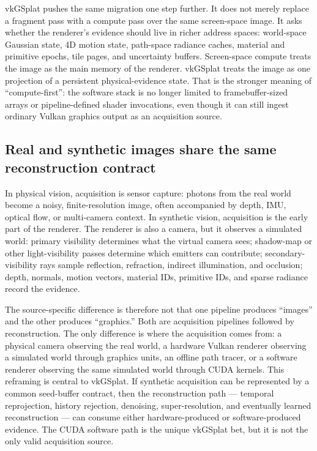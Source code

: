 \documentclass[10pt,journal,onecolumn]{IEEEtran}
\begin{document}
vkGSplat pushes the same migration one step further. It does not merely replace
a fragment pass with a compute pass over the same screen-space image. It asks
whether the renderer's evidence should live in richer address spaces:
world-space Gaussian state, 4D motion state, path-space radiance caches,
material and primitive epochs, tile pages, and uncertainty buffers. Screen-space
compute treats the image as the main memory of the renderer. vkGSplat treats the
image as one projection of a persistent physical-evidence state. That is the
stronger meaning of ``compute-first'': the software stack is no longer limited
to framebuffer-sized arrays or pipeline-defined shader invocations, even though
it can still ingest ordinary Vulkan graphics output as an acquisition source.

\subsection{Real and synthetic images share the same reconstruction
contract}

In physical vision, acquisition is sensor capture: photons from the
real world become a noisy, finite-resolution image, often accompanied
by depth, IMU, optical flow, or multi-camera context. In synthetic
vision, acquisition is the early part of the renderer. The renderer is
also a camera, but it observes a simulated world: primary visibility
determines what the virtual camera sees; shadow-map or other
light-visibility passes determine which emitters can contribute;
secondary-visibility rays sample reflection, refraction, indirect
illumination, and occlusion; depth, normals, motion vectors, material
IDs, primitive IDs, and sparse radiance record the evidence.

The source-specific difference is therefore not that one pipeline
produces ``images'' and the other produces ``graphics.'' Both are
acquisition pipelines followed by reconstruction. The only difference is
where the acquisition comes from: a physical camera observing the real
world, a hardware Vulkan renderer observing a simulated world through graphics
units, an offline path tracer, or a software renderer observing the same
simulated world through CUDA kernels. This reframing is central to vkGSplat. If
synthetic acquisition can be represented by a common seed-buffer contract, then
the reconstruction path --- temporal reprojection, history rejection, denoising,
super-resolution, and eventually learned reconstruction --- can consume either
hardware-produced or software-produced evidence. The CUDA software path is the
unique vkGSplat bet, but it is not the only valid acquisition source.
\end{document}

